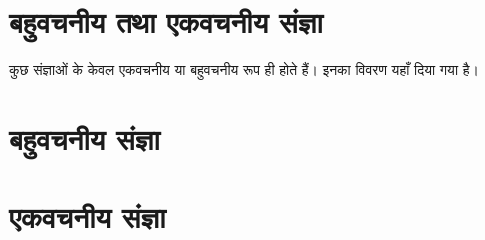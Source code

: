 \section{बहुवचनीय तथा एकवचनीय संज्ञा}\label{sec: noun-singular-plural-form-only}
कुछ संज्ञाओं के केवल एकवचनीय या बहुवचनीय रूप ही होते हैं। इनका विवरण यहाँ दिया गया है।

\section{बहुवचनीय संज्ञा}\label{sec: noun-plural-form-only}

\section{एकवचनीय संज्ञा}\label{sec: noun-singular-form-only}
